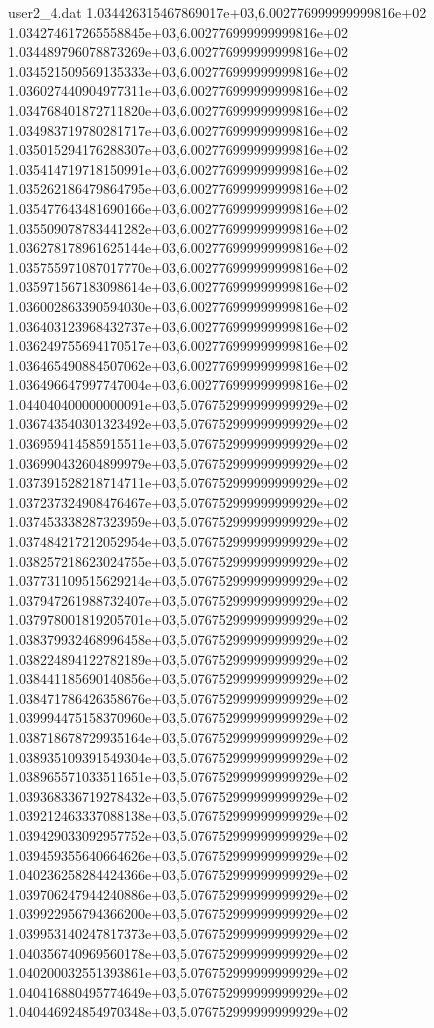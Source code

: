\begin{filecontents}{user2_4.dat}
1.034426315467869017e+03,6.002776999999999816e+02
1.034274617265558845e+03,6.002776999999999816e+02
1.034489796078873269e+03,6.002776999999999816e+02
1.034521509569135333e+03,6.002776999999999816e+02
1.036027440904977311e+03,6.002776999999999816e+02
1.034768401872711820e+03,6.002776999999999816e+02
1.034983719780281717e+03,6.002776999999999816e+02
1.035015294176288307e+03,6.002776999999999816e+02
1.035414719718150991e+03,6.002776999999999816e+02
1.035262186479864795e+03,6.002776999999999816e+02
1.035477643481690166e+03,6.002776999999999816e+02
1.035509078783441282e+03,6.002776999999999816e+02
1.036278178961625144e+03,6.002776999999999816e+02
1.035755971087017770e+03,6.002776999999999816e+02
1.035971567183098614e+03,6.002776999999999816e+02
1.036002863390594030e+03,6.002776999999999816e+02
1.036403123968432737e+03,6.002776999999999816e+02
1.036249755694170517e+03,6.002776999999999816e+02
1.036465490884507062e+03,6.002776999999999816e+02
1.036496647997747004e+03,6.002776999999999816e+02
1.044040400000000091e+03,5.076752999999999929e+02
1.036743540301323492e+03,5.076752999999999929e+02
1.036959414585915511e+03,5.076752999999999929e+02
1.036990432604899979e+03,5.076752999999999929e+02
1.037391528218714711e+03,5.076752999999999929e+02
1.037237324908476467e+03,5.076752999999999929e+02
1.037453338287323959e+03,5.076752999999999929e+02
1.037484217212052954e+03,5.076752999999999929e+02
1.038257218623024755e+03,5.076752999999999929e+02
1.037731109515629214e+03,5.076752999999999929e+02
1.037947261988732407e+03,5.076752999999999929e+02
1.037978001819205701e+03,5.076752999999999929e+02
1.038379932468996458e+03,5.076752999999999929e+02
1.038224894122782189e+03,5.076752999999999929e+02
1.038441185690140856e+03,5.076752999999999929e+02
1.038471786426358676e+03,5.076752999999999929e+02
1.039994475158370960e+03,5.076752999999999929e+02
1.038718678729935164e+03,5.076752999999999929e+02
1.038935109391549304e+03,5.076752999999999929e+02
1.038965571033511651e+03,5.076752999999999929e+02
1.039368336719278432e+03,5.076752999999999929e+02
1.039212463337088138e+03,5.076752999999999929e+02
1.039429033092957752e+03,5.076752999999999929e+02
1.039459355640664626e+03,5.076752999999999929e+02
1.040236258284424366e+03,5.076752999999999929e+02
1.039706247944240886e+03,5.076752999999999929e+02
1.039922956794366200e+03,5.076752999999999929e+02
1.039953140247817373e+03,5.076752999999999929e+02
1.040356740969560178e+03,5.076752999999999929e+02
1.040200032551393861e+03,5.076752999999999929e+02
1.040416880495774649e+03,5.076752999999999929e+02
1.040446924854970348e+03,5.076752999999999929e+02

\end{filecontents}
